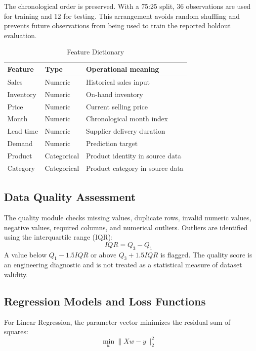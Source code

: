 \documentclass[9pt,conference]{IEEEtran}
\providecommand{\syscite}[1]{}
\begin{document}
The chronological order is preserved. \syscite{[cite: 1]} With a 75:25 split, 36 observations are used for training and 12 for testing. \syscite{[cite: 1]} This arrangement avoids random shuffling and prevents future observations from being used to train the reported holdout evaluation. \syscite{[cite: 1]}

\begin{table}[htbp]
\centering
\caption{Feature Dictionary}
\scriptsize
\setlength{\tabcolsep}{2.5pt}
\begin{tabular}{lll}
\toprule
\textbf{Feature} & \textbf{Type} & \textbf{Operational meaning} \\
\midrule
Sales & Numeric & Historical sales input \syscite{[cite: 1]} \\
Inventory & Numeric & On-hand inventory \syscite{[cite: 1]} \\
Price & Numeric & Current selling price \syscite{[cite: 1]} \\
Month & Numeric & Chronological month index \syscite{[cite: 1]} \\
Lead time & Numeric & Supplier delivery duration \syscite{[cite: 1]} \\
Demand & Numeric & Prediction target \syscite{[cite: 1]} \\
Product & Categorical & Product identity in source data \syscite{[cite: 1]} \\
Category & Categorical & Product category in source data \syscite{[cite: 1]} \\
\bottomrule
\end{tabular}
\label{tab:features}
\end{table}

\subsection{Data Quality Assessment}
The quality module checks missing values, duplicate rows, invalid numeric values, negative values, required columns, and numerical outliers. \syscite{[cite: 1]} Outliers are identified using the interquartile range (IQR): \syscite{[cite: 1]}
\begin{equation}
IQR=Q_{3}-Q_{1}
\end{equation}
A value below $Q_{1}-1.5IQR$ or above $Q_{3}+1.5IQR$ is flagged. \syscite{[cite: 1]} The quality score is an engineering diagnostic and is not treated as a statistical measure of dataset validity. \syscite{[cite: 1]}

\subsection{Regression Models and Loss Functions}
For Linear Regression, the parameter vector minimizes the residual sum of squares: \syscite{[cite: 1]}
\begin{equation}
\min_{w} \| Xw - y \|_{2}^{2}
\end{equation}
\end{document}
